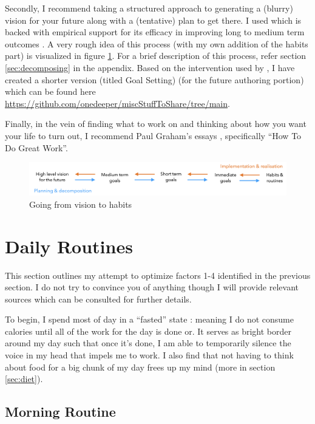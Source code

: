 \documentclass[10pt,twocolumn]{extarticle}
\begin{document}
Secondly, I recommend taking a structured approach to generating a (blurry) vision for your future along with a (tentative) plan to get there. I used \cite{selfauthoring} which is backed with empirical support for its efficacy in improving long to medium term outcomes \cite{morisano2010setting,schippers2015scalable}. A very rough idea of this process (with my own addition of the habits part) is visualized in figure \ref{fig:decompose}. For a brief description of this process, refer section \ref{sec:decomposing} in the appendix. Based on the intervention used by \cite{schippers2015scalable}, I have created a shorter version (titled Goal Setting) (for the future authoring portion) which can be found here \url{https://github.com/onedeeper/miscStuffToShare/tree/main}.

Finally, in the vein of finding what to work on and thinking about how you want your life to turn out, I recommend Paul Graham's essays \cite{graham_essays}, specifically ``How To Do Great Work''.

\begin{figure}[htbp]
    \centering
    \includegraphics[scale=0.4]{decompose.png}
    \caption{Going from vision to habits}
    \label{fig:decompose}
  \end{figure}

\section{Daily Routines}
This section outlines my attempt to optimize factors 1-4 identified in the previous section. I do not try to convince you of anything though I will provide relevant sources which can be consulted for further details.

To begin, I spend most of day in a ``fasted'' state : meaning I do not consume calories until all of the work for the day is done or. It serves as bright border around my day such that once it's done, I am able to temporarily silence the voice in my head that impels me to work. I also find that not having to think about food for a big chunk of my day frees up my mind (more in section \ref{sec:diet}).

\subsection{Morning Routine}
\end{document}
